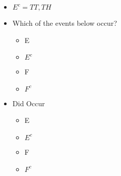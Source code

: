 \documentclass[10pt]{article}
\begin{document}
\begin{itemize}
\begin{itemize}
            \item $E^c = {TT, TH}$
            \item Which of the events below occur?
                \begin{itemize}
                    \item E 
                    \item $E^c$
                    \item F
                    \item $F^c$
                \end{itemize}
            \item Did Occur
                \begin{itemize}
                    \item E 
                    \item $E^c$
                    \item F
                    \item $F^c$
                \end{itemize}
        \end{itemize}
\end{itemize}
\end{document}
